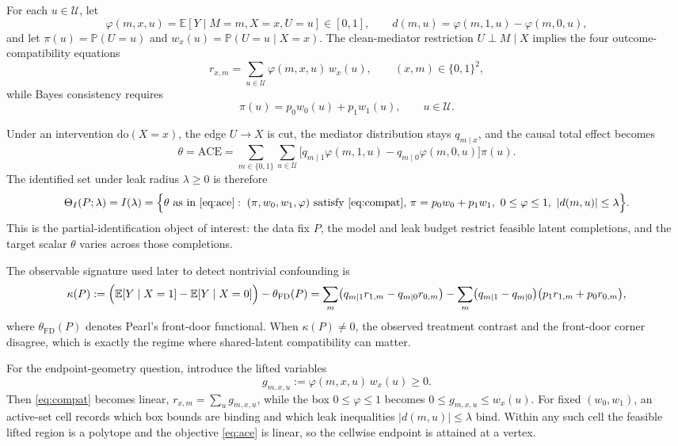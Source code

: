 \documentclass[11pt]{article}
\newcommand{\E}{\mathbb{E}}
\renewcommand{\Pr}{\mathbb{P}}
\theoremstyle{definition}
\theoremstyle{plain}
\theoremstyle{remark}
\begin{document}
For each \(u\in\mathcal U\), let
\[
  \varphi(m,x,u)=\E[Y\mid M=m,X=x,U=u]\in[0,1],\qquad
  d(m,u)=\varphi(m,1,u)-\varphi(m,0,u),
\]
and let \(\pi(u)=\Pr(U=u)\) and \(w_x(u)=\Pr(U=u\mid X=x)\). The clean-mediator
restriction \(U\perp M\mid X\) implies the four outcome-compatibility equations
\begin{equation}\label{eq:compat}
  r_{x,m}=\sum_{u\in\mathcal U}\varphi(m,x,u)\,w_x(u),
  \qquad (x,m)\in\{0,1\}^2,
\end{equation}
while Bayes consistency requires
\[
  \pi(u)=p_0 w_0(u)+p_1 w_1(u),\qquad u\in\mathcal U.
\]

Under an intervention \(\mathrm{do}(X=x)\), the edge \(U\to X\) is cut, the mediator
distribution stays \(q_{m\mid x}\), and the causal total effect becomes
\begin{equation}\label{eq:ace}
  \theta=\mathrm{ACE}
  =\sum_{m\in\{0,1\}}\sum_{u\in\mathcal U}
   \bigl[q_{m\mid1}\varphi(m,1,u)-q_{m\mid0}\varphi(m,0,u)\bigr]\pi(u).
\end{equation}
The identified set under leak radius \(\lambda\ge 0\) is therefore
\[
  \Theta_I(P;\lambda)=I(\lambda)
  =\Bigl\{\theta \text{ as in \eqref{eq:ace}}:\;
    (\pi,w_0,w_1,\varphi)\text{ satisfy \eqref{eq:compat}, }
    \pi=p_0w_0+p_1w_1,\ 0\le \varphi\le 1,\ |d(m,u)|\le \lambda
  \Bigr\}.
\]
This is the partial-identification object of interest: the data fix \(P\), the model
and leak budget restrict feasible latent completions, and the target scalar \(\theta\)
varies across those completions.

The observable signature used later to detect nontrivial confounding is
\begin{equation}\label{eq:kappa}
  \kappa(P)
  :=\Bigl(\E[Y\mid X=1]-\E[Y\mid X=0]\Bigr)-\theta_{\mathrm{FD}}(P)
  =\sum_m\bigl(q_{m\mid1}r_{1,m}-q_{m\mid0}r_{0,m}\bigr)
   -\sum_m\bigl(q_{m\mid1}-q_{m\mid0}\bigr)\bigl(p_1r_{1,m}+p_0r_{0,m}\bigr),
\end{equation}
where \(\theta_{\mathrm{FD}}(P)\) denotes Pearl's front-door functional. When
\(\kappa(P)\neq 0\), the observed treatment contrast and the front-door corner disagree,
which is exactly the regime where shared-latent compatibility can matter.

For the endpoint-geometry question, introduce the lifted variables
\[
  g_{m,x,u}:=\varphi(m,x,u)\,w_x(u)\ge 0.
\]
Then \eqref{eq:compat} becomes linear, \(r_{x,m}=\sum_u g_{m,x,u}\), while the box
\(0\le \varphi\le 1\) becomes \(0\le g_{m,x,u}\le w_x(u)\). For fixed \((w_0,w_1)\),
an active-set cell records which box bounds are binding and which leak inequalities
\(|d(m,u)|\le \lambda\) bind. Within any such cell the feasible lifted region is a
polytope and the objective \eqref{eq:ace} is linear, so the cellwise endpoint is
attained at a vertex.
\end{document}
